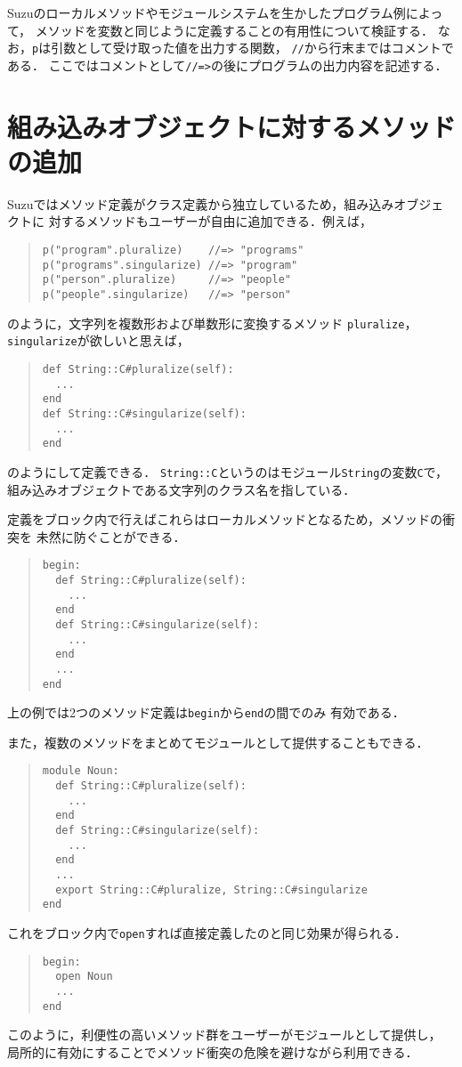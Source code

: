 \documentclass[a4paper,11pt,dvipdfmx]{jreport}
\begin{document}
Suzuのローカルメソッドやモジュールシステムを生かしたプログラム例によって，
メソッドを変数と同じように定義することの有用性について検証する．
なお，\verb|p|は引数として受け取った値を出力する関数，
\verb|//|から行末まではコメントである．
ここではコメントとして\verb|//=>|の後にプログラムの出力内容を記述する．

\section{組み込みオブジェクトに対するメソッドの追加}
\label{section:builtin}

Suzuではメソッド定義がクラス定義から独立しているため，組み込みオブジェクトに
対するメソッドもユーザーが自由に追加できる．例えば，
\begin{quote}
\begin{verbatim}
p("program".pluralize)    //=> "programs"
p("programs".singularize) //=> "program"
p("person".pluralize)     //=> "people"
p("people".singularize)   //=> "person"
\end{verbatim}
\end{quote}
のように，文字列を複数形および単数形に変換するメソッド
\verb|pluralize|，\verb|singularize|が欲しいと思えば，
\begin{quote}
\begin{verbatim}
def String::C#pluralize(self):
  ...
end
def String::C#singularize(self):
  ...
end
\end{verbatim}
\end{quote}
のようにして定義できる．
\verb|String::C|というのはモジュール\verb|String|の変数\verb|C|で，
組み込みオブジェクトである文字列のクラス名を指している．

定義をブロック内で行えばこれらはローカルメソッドとなるため，メソッドの衝突を
未然に防ぐことができる．
\begin{quote}
\begin{verbatim}
begin:
  def String::C#pluralize(self):
    ...
  end
  def String::C#singularize(self):
    ...
  end
  ...
end
\end{verbatim}
\end{quote}
上の例では2つのメソッド定義は\verb|begin|から\verb|end|の間でのみ
有効である．

また，複数のメソッドをまとめてモジュールとして提供することもできる．
\begin{quote}
\begin{verbatim}
module Noun:
  def String::C#pluralize(self):
    ...
  end
  def String::C#singularize(self):
    ...
  end
  ...
  export String::C#pluralize, String::C#singularize
end
\end{verbatim}
\end{quote}
これをブロック内で\verb|open|すれば直接定義したのと同じ効果が得られる．
\begin{quote}
\begin{verbatim}
begin:
  open Noun
  ...
end
\end{verbatim}
\end{quote}
このように，利便性の高いメソッド群をユーザーがモジュールとして提供し，
局所的に有効にすることでメソッド衝突の危険を避けながら利用できる．
\end{document}
